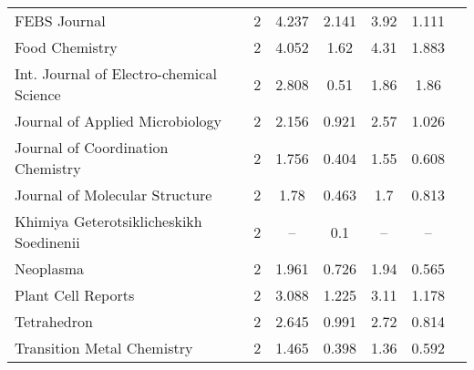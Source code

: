 {\begin{longtable}[c]{lcccccc}
  FEBS Journal                                            & 2  & 4.237         & 2.141          & 3.92 & 1.111         \\
  Food Chemistry                                          & 2  & 4.052         & 1.62           & 4.31 & 1.883         \\[1ex]
  Int. Journal of Electro-chemical Science                & 2  & 2.808         & 0.51           & 1.86 & 1.86          \\
  Journal of Applied Microbiology                         & 2  & 2.156         & 0.921          & 2.57 & 1.026         \\
  Journal of Coordination Chemistry                       & 2  & 1.756         & 0.404          & 1.55 & 0.608         \\
  Journal of Molecular Structure                          & 2  & 1.78          & 0.463          & 1.7  & 0.813         \\[1ex]
  Khimiya Geterotsiklicheskikh Soedinenii                 & 2  & --            & 0.1            & --   & --              \\
  Neoplasma                                               & 2  & 1.961         & 0.726          & 1.94 & 0.565         \\
  Plant Cell Reports                                      & 2  & 3.088         & 1.225          & 3.11 & 1.178         \\
  Tetrahedron                                             & 2  & 2.645         & 0.991          & 2.72 & 0.814         \\
  Transition Metal Chemistry                              & 2  & 1.465         & 0.398          & 1.36 & 0.592         \\[0.5ex]
\end{longtable}}

